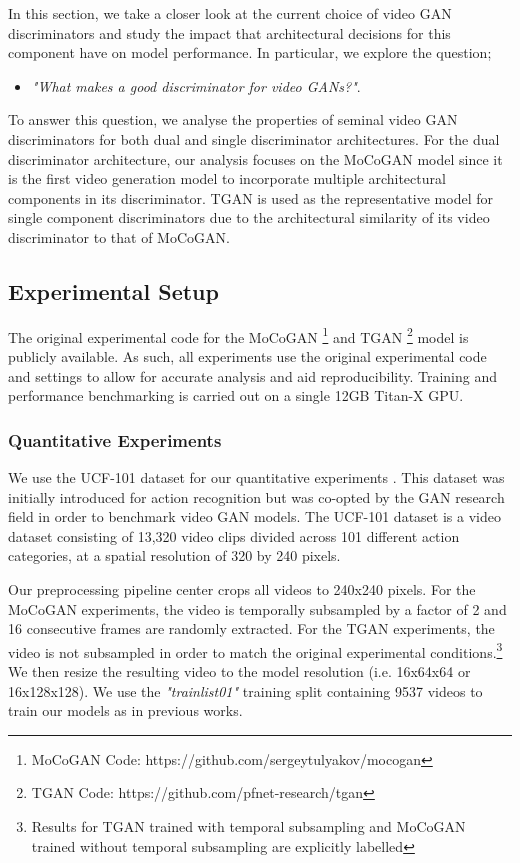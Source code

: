 \documentclass[a4paper,fleqn]{cas-sc}
\begin{document}
In this section, we take a closer look at the current choice of video GAN discriminators and study the impact that architectural decisions for this component have on model performance. In particular, we explore the question;

\begin{itemize}
    \item \textit{"What makes a good discriminator for video GANs?"}.
\end{itemize}


To answer this question, we analyse the properties of seminal video GAN discriminators for both dual and single discriminator architectures. For the dual discriminator architecture, our analysis focuses on the MoCoGAN model since it is the first video generation model to incorporate multiple architectural components in its discriminator. TGAN is used as the representative model for single component discriminators due to the  architectural similarity of its video discriminator to that of MoCoGAN.

\newpage
\subsection{Experimental Setup}
The original experimental code for the MoCoGAN \footnote{MoCoGAN Code: https://github.com/sergeytulyakov/mocogan} and TGAN \footnote{TGAN Code: https://github.com/pfnet-research/tgan} model is publicly available.
As such, all experiments use the original experimental code and settings to allow for accurate analysis and aid reproducibility. 
Training and performance benchmarking is carried out on a single 12GB Titan-X GPU. 


\subsubsection{Quantitative Experiments}
We use the UCF-101 dataset for our quantitative experiments \cite{soomroZS2012ucf101}. This dataset was initially introduced for action recognition but was co-opted by the GAN research field in order to benchmark video GAN models. The UCF-101 dataset \cite{soomroZS2012ucf101} is a video dataset consisting of 13,320 video clips divided across 101 different action categories, at a spatial resolution of 320 by 240 pixels.

Our preprocessing pipeline center crops all videos to 240x240 pixels. For the MoCoGAN experiments, the video is temporally subsampled by a factor of 2 and 16 consecutive frames are randomly extracted. For the TGAN experiments, the video is not subsampled in order to match the original experimental conditions.\footnote{Results for TGAN trained with temporal subsampling and MoCoGAN trained without temporal subsampling are explicitly labelled} We then resize the resulting video to the model resolution (i.e. 16x64x64 or 16x128x128). We use the \textit{"trainlist01"} training split containing 9537 videos to train our models as in previous works.
\end{document}
